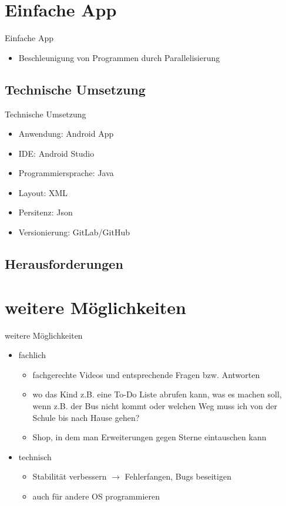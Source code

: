 \documentclass[10pt,fleqn]{beamer}
\begin{document}
\section{Einfache App}
\begin{frame}[t]{Einfache App}
	\begin{itemize}
		\item Beschleunigung von Programmen durch Parallelisierung
	\end{itemize}
\end{frame}

\subsection{Technische Umsetzung}
\begin{frame}[t]{Technische Umsetzung}
	\begin{itemize}
		\item Anwendung: Android App
		\item IDE: Android Studio
		\item Programmiersprache: Java
		\item Layout: XML
		\item Persitenz: Json
		\item Versionierung: GitLab/GitHub
	\end{itemize}
\end{frame}

\subsection{Herausforderungen}

\section{weitere Möglichkeiten}
\begin{frame}[t]{weitere Möglichkeiten}
\begin{itemize}
	\item fachlich
	\begin{itemize}
		\item fachgerechte Videos und entsprechende Fragen bzw. Antworten
		\item wo das Kind z.B. eine To-Do Liste abrufen kann, was es machen soll,
		wenn z.B. der Bus nicht kommt oder welchen Weg muss ich von der Schule bis nach
		Hause gehen?
		\item Shop, in dem man Erweiterungen gegen Sterne eintauschen kann
	\end{itemize}
	\item technisch
		\begin{itemize}
		\item Stabilität verbessern $\rightarrow$ Fehlerfangen, Bugs beseitigen
		\item auch für andere OS programmieren 
	\end{itemize}
	
\end{itemize}

\end{frame}
\end{document}
